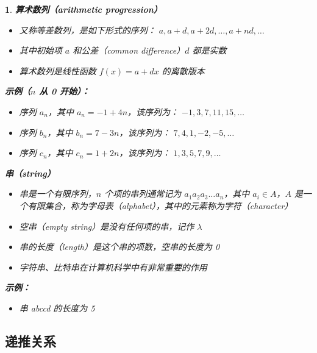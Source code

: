 \documentclass[UTF8]{report}
\theoremstyle{MyLineTheoremStyle} %
\theoremstyle{MyBlockTheoremStyle} %
\theoremstyle{MySubsubsectionStyle} %
\newtheorem{definition}{}
\begin{document}
\begin{definition}
    \textbf{算术数列（arithmetic progression）}\par
    \begin{itemize}
        \item 又称等差数列，是如下形式的序列： $a, a + d, a + 2d, \ldots, a + nd, \ldots$
        \item 其中初始项 $a$ 和公差（common difference）$d$ 都是实数
        \item 算术数列是线性函数 $f(x) = a + dx$ 的离散版本
    \end{itemize}
    \textbf{示例（$n$ 从 0 开始）：}\par
    \begin{itemize}
        \item 序列 $a_n$，其中 $a_n = -1 + 4n$，该序列为： $-1, 3, 7, 11, 15, \ldots$
        \item 序列 $b_n$，其中 $b_n = 7 - 3n$，该序列为： $7, 4, 1, -2, -5, \ldots$
        \item 序列 $c_n$，其中 $c_n = 1 + 2n$，该序列为： $1, 3, 5, 7, 9, \ldots$
    \end{itemize}

    \textbf{串（string）}\par
    \begin{itemize}
        \item 串是一个有限序列，$n$ 个项的串列通常记为 $a_1a_2a_3 \ldots a_n$，其中 $a_i \in A$，$A$ 是一个有限集合，称为字母表（alphabet），其中的元素称为字符（character）
        \item 空串（empty string）是没有任何项的串，记作 $\lambda$
        \item 串的长度（length）是这个串的项数，空串的长度为 0
        \item 字符串、比特串在计算机科学中有非常重要的作用
    \end{itemize}
    \textbf{示例：}\par
    \begin{itemize}
        \item 串 abccd 的长度为 5
    \end{itemize}
\end{definition}

\subsection{递推关系}
\end{document}

